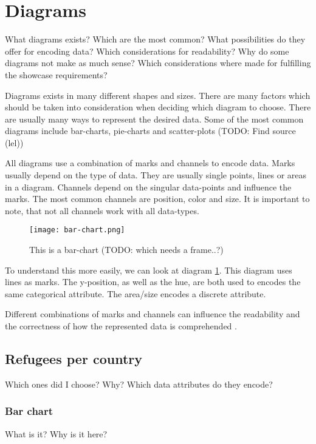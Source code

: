 \section{Diagrams}
What diagrams exists? Which are the most common? What possibilities do they offer for encoding data? Which considerations for readability? Why do some diagrams not make as much sense? Which considerations where made for fulfilling the showcase requirements?

Diagrams exists in many different shapes and sizes. There are many factors which should be taken into consideration when deciding which diagram to choose. There are usually many ways to represent the desired data. Some of the most common diagrams include bar-charts, pie-charts and scatter-plots (TODO: Find source (lel))

All diagrams use a combination of marks and channels to encode data. Marks usually depend on the type of data. They are usually single points, lines or areas in a diagram. Channels depend on the singular data-points and influence the marks. The most common channels are position, color and size. It is important to note, that not all channels work with all data-types.

\begin{figure}
    \label{fig:bar-chart}
    \texttt{[image: bar-chart.png]}
    \caption[bar-chart]{This is a bar-chart (TODO: which needs a frame..?)}
\end{figure}

To understand this more easily, we can look at diagram \ref{fig:bar-chart}. This diagram uses lines as marks. The y-position, as well as the hue, are both used to encodes the same categorical attribute. The area/size encodes a discrete attribute.

Different combinations of marks and channels can influence the readability and the correctness of how the represented data is comprehended \cite{heer2010crowdsourcing} \cite{mackinlay1986automating}.



\subsection{Refugees per country}
Which ones did I choose? Why? Which data attributes do they encode?

\subsubsection{Bar chart}
What is it? Why is it here?

